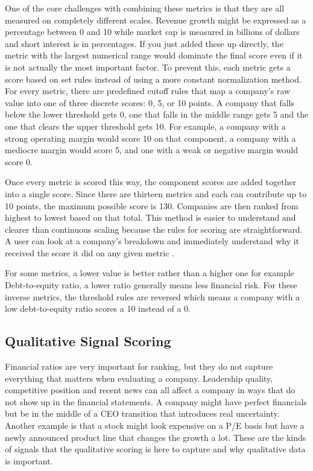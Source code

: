 \documentclass[12pt]{article}
\begin{document}
One of the core challenges with combining these metrics is that they are all measured on completely different scales. Revenue growth might be expressed as a percentage between 0 and 10 while market cap is measured in billions of dollars and short interest is in percentages. If you just added these up directly, the metric with the largest numerical range would dominate the final score even if it is not actually the most important factor. To prevent this, each metric gets a score based on set rules instead of using a more constant normalization method. For every metric, there are predefined cutoff rules that map a company's raw value into one of three discrete scores: 0, 5, or 10 points. A company that falls below the lower threshold gets 0, one that falls in the middle range gets 5 and the one that clears the upper threshold gets 10. For example, a company with a strong operating margin would score 10 on that component, a company with a mediocre margin would score 5, and one with a weak or negative margin would score 0.

Once every metric is scored this way, the component scores are added together into a single score. Since there are thirteen metrics and each can contribute up to 10 points, the maximum possible score is 130. Companies are then ranked from highest to lowest based on that total. This method is easier to understand and clearer than continuous scaling because the rules for scoring are straightforward. A user can look at a company's breakdown and immediately understand why it received the score it did on any given metric \cite{behzadian2012vikor}.

For some metrics, a lower value is better rather than a higher one for example Debt-to-equity ratio, a lower ratio generally means less financial risk. For these inverse metrics, the threshold rules are reversed which means a company with a low debt-to-equity ratio scores a 10 instead of a 0.

\subsection{Qualitative Signal Scoring}
Financial ratios are very important for ranking, but they do not capture everything that matters when evaluating a company. Leadership quality, competitive position and recent news can all affect a company in ways that do not show up in the financial statements. A company might have perfect financials but be in the middle of a CEO transition that introduces real uncertainty. Another example is that a stock might look expensive on a P/E basis but have a newly announced product line that changes the growth a lot. These are the kinds of signals that the qualitative scoring is here to capture and why qualitative data is important.
\end{document}
